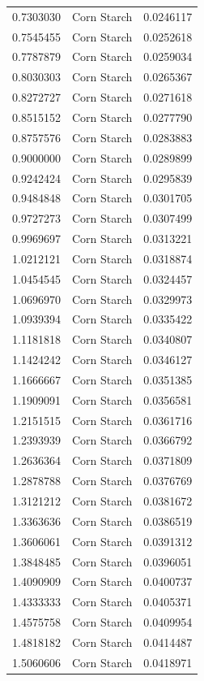 \documentclass[
  12pt,
]{article}
\begin{document}
{\begin{longtable}[]{@{}rlr@{}}
0.7303030 & Corn Starch & 0.0246117 \\
0.7545455 & Corn Starch & 0.0252618 \\
0.7787879 & Corn Starch & 0.0259034 \\
0.8030303 & Corn Starch & 0.0265367 \\
0.8272727 & Corn Starch & 0.0271618 \\
0.8515152 & Corn Starch & 0.0277790 \\
0.8757576 & Corn Starch & 0.0283883 \\
0.9000000 & Corn Starch & 0.0289899 \\
0.9242424 & Corn Starch & 0.0295839 \\
0.9484848 & Corn Starch & 0.0301705 \\
0.9727273 & Corn Starch & 0.0307499 \\
0.9969697 & Corn Starch & 0.0313221 \\
1.0212121 & Corn Starch & 0.0318874 \\
1.0454545 & Corn Starch & 0.0324457 \\
1.0696970 & Corn Starch & 0.0329973 \\
1.0939394 & Corn Starch & 0.0335422 \\
1.1181818 & Corn Starch & 0.0340807 \\
1.1424242 & Corn Starch & 0.0346127 \\
1.1666667 & Corn Starch & 0.0351385 \\
1.1909091 & Corn Starch & 0.0356581 \\
1.2151515 & Corn Starch & 0.0361716 \\
1.2393939 & Corn Starch & 0.0366792 \\
1.2636364 & Corn Starch & 0.0371809 \\
1.2878788 & Corn Starch & 0.0376769 \\
1.3121212 & Corn Starch & 0.0381672 \\
1.3363636 & Corn Starch & 0.0386519 \\
1.3606061 & Corn Starch & 0.0391312 \\
1.3848485 & Corn Starch & 0.0396051 \\
1.4090909 & Corn Starch & 0.0400737 \\
1.4333333 & Corn Starch & 0.0405371 \\
1.4575758 & Corn Starch & 0.0409954 \\
1.4818182 & Corn Starch & 0.0414487 \\
1.5060606 & Corn Starch & 0.0418971 \\

\end{longtable}}
\end{document}
